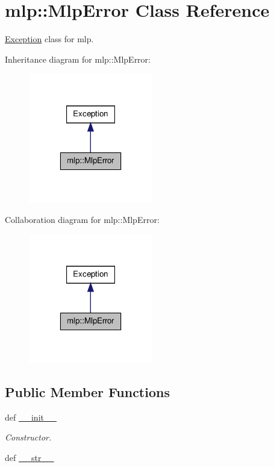 \hypertarget{classmlp_1_1MlpError}{
\section{mlp::MlpError Class Reference}
\label{classmlp_1_1MlpError}
}


\hyperlink{classException}{Exception} class for mlp.  




Inheritance diagram for mlp::MlpError:
\nopagebreak
\begin{figure}[H]
\begin{center}
\leavevmode
\includegraphics[width=154pt]{classmlp_1_1MlpError__inherit__graph}
\end{center}
\end{figure}


Collaboration diagram for mlp::MlpError:
\nopagebreak
\begin{figure}[H]
\begin{center}
\leavevmode
\includegraphics[width=154pt]{classmlp_1_1MlpError__coll__graph}
\end{center}
\end{figure}
\subsection*{Public Member Functions}
\begin{DoxyCompactItemize}
\item 
def \hyperlink{classmlp_1_1MlpError_a7d524593f7cdd8e23b91eba473fa9b58}{\_\-\_\-init\_\-\_\-}
\begin{DoxyCompactList}\small\item\em Constructor. \item\end{DoxyCompactList}\item 
def \hyperlink{classmlp_1_1MlpError_a660e2a1c32bf1ea08a1dcd0e123eb0be}{\_\-\_\-str\_\-\_\-}
\end{DoxyCompactItemize}
